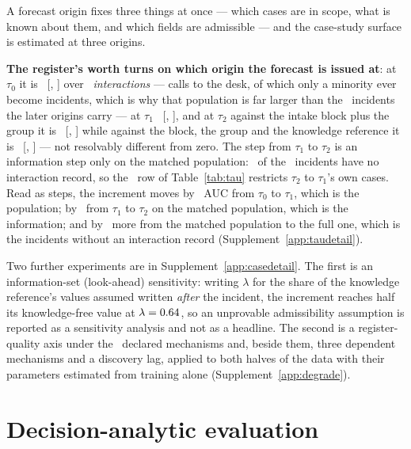 \documentclass[11pt,3p,review,authoryear]{elsarticle}
\theoremstyle{definition}
\begin{document}
A forecast origin fixes three things at once --- which cases are in scope,
what is known about them, and which fields are admissible --- and the
case-study surface is estimated at three origins.



\textbf{The register's worth turns on which origin the forecast is issued
at}: at $\tau_0$ it is \VtauZero\ [\VtauZeroLo, \VtauZeroHi] over
\nTauZero\ \emph{interactions} --- calls to the desk, of which only a
minority ever become incidents, which is why that population is far larger
than the \nTauTwo\ incidents the later origins carry --- at $\tau_1$
\VtauOne\ [\VtauOneLo, \VtauOneHi], and at $\tau_2$ against the intake block
plus the group it is \VTtwoGroup\ [\VTtwoGroupLo, \VTtwoGroupHi] while
against the block, the group and the knowledge reference it is \VTtwoKnow\
[\VTtwoKnowLo, \VTtwoKnowHi] --- not resolvably different from zero. The step
from $\tau_1$ to $\tau_2$ is an information step only on the matched
population: \nTauTwoUnmatched\ of the \nTauTwo\ incidents have no interaction
record, so the \tauMatchedRow\ row of Table~\ref{tab:tau} restricts $\tau_2$
to $\tau_1$'s own cases. Read as steps, the increment moves by
\deltaCohortAtTau\ AUC from $\tau_0$ to $\tau_1$, which is the population; by
\deltaSnapshotAtTau\ from $\tau_1$ to $\tau_2$ on the matched population,
which is the information; and by \deltaPopulationResidual\ more from the
matched population to the full one, which is the incidents without an
interaction record (Supplement~\ref{app:taudetail}).

\label{sec:quality}
Two further experiments are in Supplement~\ref{app:casedetail}. The first is
an information-set (look-ahead) sensitivity: writing $\lambda$ for the share
of the knowledge reference's values assumed written \emph{after} the
incident, the increment reaches half its knowledge-free value at
$\lambda = 0.64$, so an unprovable admissibility assumption is
reported as a sensitivity analysis and not as a headline. The second is a
register-quality axis under the \nQualityKinds\ declared mechanisms and,
beside them, three dependent mechanisms and a discovery lag, applied to both
halves of the data with their parameters estimated from training alone
(Supplement~\ref{app:degrade}).

\section{Decision-analytic evaluation}
\label{sec:dca}
\end{document}
